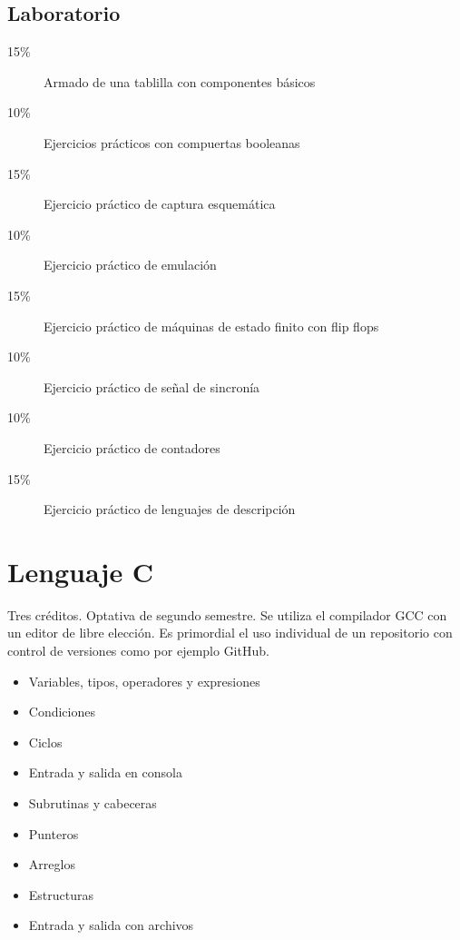 \documentclass{article}
\begin{document}
\begin{multicols}{4}
\subsection*{Laboratorio}

\begin{description}
\item[15\%]{Armado de una tablilla con componentes b\'{a}sicos}
\item[10\%]{Ejercicios pr\'{a}cticos con compuertas booleanas}
\item[15\%]{Ejercicio pr\'{a}ctico de captura esquem\'{a}tica}
\item[10\%]{Ejercicio pr\'{a}ctico de emulaci\'{o}n}  
\item[15\%]{Ejercicio pr\'{a}ctico de m\'{a}quinas de estado finito con flip flops}
\item[10\%]{Ejercicio pr\'{a}ctico de se\~{n}al de sincron\'{i}a}
\item[10\%]{Ejercicio pr\'{a}ctico de contadores}
\item[15\%]{Ejercicio pr\'{a}ctico de lenguajes de descripci\'{o}n}      
\end{description}

\newpage

\hypertarget{lac}{\section*{Lenguaje C}}

Tres cr\'{e}ditos. Optativa de segundo semestre. Se utiliza el
compilador GCC con un editor de libre elecci\'{o}n. Es primordial el
uso individual de un repositorio con control de versiones como por
ejemplo GitHub.

\begin{itemize}
\item{Variables, tipos, operadores y expresiones}
\item{Condiciones}
\item{Ciclos}
\item{Entrada y salida en consola}
\item{Subrutinas y cabeceras}
\item{Punteros}
\item{Arreglos}
\item{Estructuras}
\item{Entrada y salida con archivos}  
\end{itemize}


\end{multicols}
\end{document}
